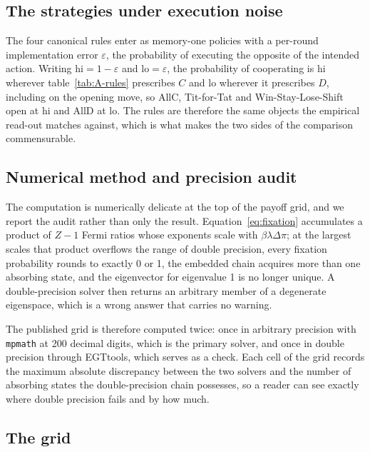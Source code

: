 \documentclass[11pt,a4paper]{article}
\newcommand{\lam}{\lambda}
\begin{document}
\subsection{The strategies under execution noise}\label{appendix:egt_strategies}

The four canonical rules enter as memory-one policies with a per-round
implementation error $\varepsilon$, the probability of executing the opposite
of the intended action. Writing $\mathrm{hi} = 1 - \varepsilon$ and
$\mathrm{lo} = \varepsilon$, the probability of cooperating is $\mathrm{hi}$
wherever table~\ref{tab:A-rules} prescribes $C$ and $\mathrm{lo}$ wherever it
prescribes $D$, including on the opening move, so AllC, Tit-for-Tat and
Win-Stay-Lose-Shift open at $\mathrm{hi}$ and AllD at $\mathrm{lo}$. The rules
are therefore the same objects the empirical read-out matches against, which is
what makes the two sides of the comparison commensurable.

\subsection{Numerical method and precision audit}\label{appendix:egt_numerics}

The computation is numerically delicate at the top of the payoff grid, and we
report the audit rather than only the result. Equation~\eqref{eq:fixation}
accumulates a product of $Z-1$ Fermi ratios whose exponents scale with
$\beta \lam \Delta\pi$; at the largest scales that product overflows the range
of double precision, every fixation probability rounds to exactly 0 or 1, the
embedded chain acquires more than one absorbing state, and the eigenvector for
eigenvalue 1 is no longer unique. A double-precision solver then returns an
arbitrary member of a degenerate eigenspace, which is a wrong answer that
carries no warning.

The published grid is therefore computed twice: once in arbitrary precision
with \texttt{mpmath} at 200 decimal digits, which is the primary solver, and
once in double precision through EGTtools, which serves as a check. Each cell
of the grid records the maximum absolute discrepancy between the two solvers
and the number of absorbing states the double-precision chain possesses, so a
reader can see exactly where double precision fails and by how much.

\subsection{The grid}\label{appendix:egt_grid}
\end{document}
